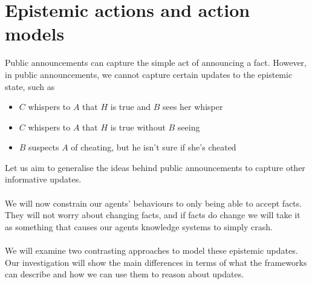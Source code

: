 \section{Epistemic actions and action models} \label{estAct}
Public announcements can capture the simple act of announcing a fact.
However, in public announcements, we cannot capture certain updates to the
epistemic state, such as
\begin{itemize} 
  \item $C$ whispers to $A$ that $H$ is true and $B$ sees her whisper
  \item $C$ whispers to $A$ that $H$ is true without $B$ seeing
  \item $B$ suspects $A$ of cheating, but he isn't sure if she's cheated
\end{itemize}
Let us aim to generalise the ideas behind public announcements to capture other
informative updates.\\
\\
We will now constrain our agents' behaviours to only being able to accept facts.
They will not worry about changing facts, and if facts do change we will take it
as something that causes our agents knowledge systems to simply crash.\\
\\
We will examine two contrasting approaches to model these epistemic updates.
Our investigation will show the main differences in terms of what the frameworks
can describe and how we can use them to reason about updates.
